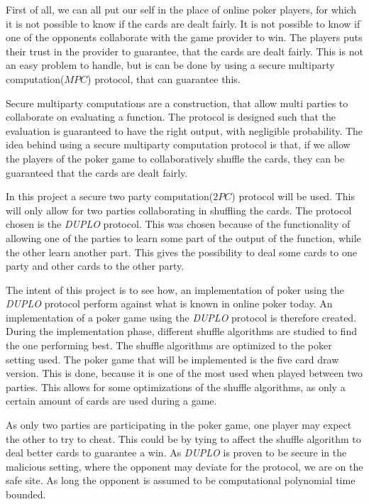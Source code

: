 \documentclass[twoside,11pt,openright]{report}
\newcommand{\DUPLO}{\textit{DUPLO} }
\begin{document}
First of all, we can all put our self in the place of online poker players, for which it is not possible to know if the cards are dealt fairly. It is not possible to know if one of the opponents collaborate with the game provider to win. The players puts their trust in the provider to guarantee, that the cards are dealt fairly. This is not an easy problem to handle, but is can be done by using a secure multiparty computation($MPC$) protocol, that can guarantee this.

Secure multiparty computations are a construction, that allow multi parties to collaborate on evaluating a function. The protocol is designed such that the evaluation is guaranteed to have the right output, with negligible probability. The idea behind using a secure multiparty computation protocol is that, if we allow the players of the poker game to collaboratively shuffle the cards, they can be guaranteed that the cards are dealt fairly.

In this project a secure two party computation($2PC$) protocol will be used. This will only allow for two parties collaborating in shuffling the cards. The protocol chosen is the \DUPLO protocol. This was chosen because of the functionality of allowing one of the parties to learn some part of the output of the function, while the other learn another part. This gives the possibility to deal some cards to one party and other cards to the other party.

The intent of this project is to see how, an implementation of poker using the \DUPLO protocol perform against what is known in online poker today. An implementation of a poker game using the \DUPLO protocol is therefore created. During the implementation phase, different shuffle algorithms are studied to find the one performing best. The shuffle algorithms are optimized to the poker setting used. The poker game that will be implemented is the five card draw version. This is done, because it is one of the most used when played between two parties. This allows for some optimizations of the shuffle algorithms, as only a certain amount of cards are used during a game.

As only two parties are participating in the poker game, one player may expect the other to try to cheat. This could be by tying to affect the shuffle algorithm to deal better cards to guarantee a win. As \DUPLO is proven to be secure in the malicious setting, where the opponent may deviate for the protocol, we are on the safe site. As long the opponent is assumed to be computational polynomial time bounded.
\end{document}

